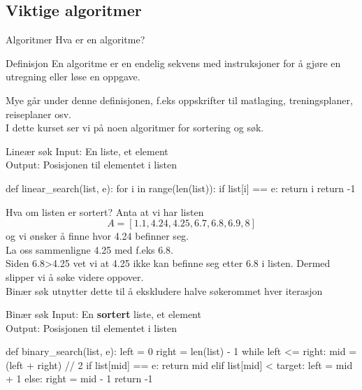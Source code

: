 \subsection{Viktige algoritmer}
\begin{frame}[fragile]{Algoritmer}
    Hva er en algoritme?\\ \pause
    \begin{block}{Definisjon}
    En algoritme er en endelig sekvens med instruksjoner for å gjøre en utregning eller løse en oppgave.
    \end{block}

    Mye går under denne definisjonen, f.eks oppskrifter til matlaging, treningsplaner, reiseplaner osv. \\
    I dette kurset ser vi på noen algoritmer for sortering og søk.
\end{frame}

\begin{frame}[fragile]{Lineær søk}
    Input: En liste, et element \\
    Output: Posisjonen til elementet i listen \\

    \begin{python}
def linear_search(list, e):
    for i in range(len(list)):
        if list[i] == e:
            return i
    return -1
    \end{python}
\end{frame}

\begin{frame}[fragile]{Hva om listen er sortert?}
    Anta at vi har listen
    $$A = [1.1, 4.24, 4.25, 6.7, 6.8, 6.9, 8]$$
    og vi ønsker å finne hvor 4.24 befinner seg.\\

    La oss sammenligne 4.25 med f.eks 6.8.\\
    Siden 6.8>4.25 vet vi at 4.25 ikke kan befinne seg etter 6.8 i listen. Dermed slipper vi å søke videre oppover. \\
    Binær søk utnytter dette til å ekskludere halve søkerommet hver iterasjon
\end{frame}

\begin{frame}[fragile]{Binær søk}
    Input: En \textbf{sortert} liste, et element \\
    Output: Posisjonen til elementet i listen \\

    \begin{python}
def binary_search(list, e):
    left = 0
    right = len(list) - 1
    while left <= right:
        mid = (left + right) // 2
        if list[mid] == e:
            return mid
        elif list[mid] < target:
            left = mid + 1
        else:
            right = mid - 1
    return -1
    \end{python}
\end{frame}

